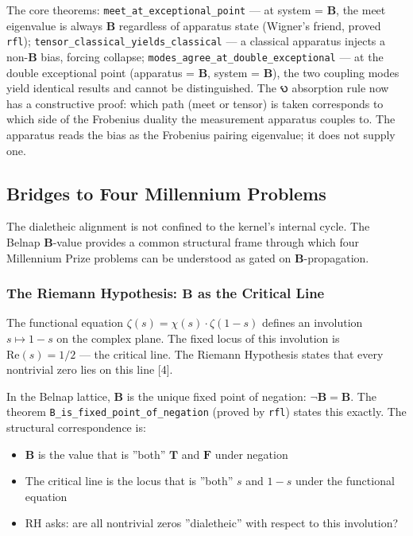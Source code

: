 \documentclass[10pt,a4paper]{article}
\begin{document}
The core theorems: \texttt{meet\_\allowbreak at\_\allowbreak exceptional\_\allowbreak point} --- at system = $\mathbf{B}$, the meet eigenvalue is always $\mathbf{B}$ regardless of apparatus state (Wigner's friend, proved \texttt{rfl}); \texttt{tensor\_\allowbreak classical\_\allowbreak yields\_\allowbreak classical} --- a classical apparatus injects a non-$\mathbf{B}$ bias, forcing collapse; \texttt{modes\_\allowbreak agree\_\allowbreak at\_\allowbreak double\_\allowbreak exceptional} --- at the double exceptional point (apparatus = $\mathbf{B}$, system = $\mathbf{B}$), the two coupling modes yield identical results and cannot be distinguished. The 𐑻 absorption rule now has a constructive proof: which path (meet or tensor) is taken corresponds to which side of the Frobenius duality the measurement apparatus couples to. The apparatus reads the bias as the Frobenius pairing eigenvalue; it does not supply one.

\subsection{Bridges to Four Millennium Problems}

The dialetheic alignment is not confined to the kernel's internal cycle. The Belnap $\mathbf{B}$-value provides a common structural frame through which four Millennium Prize problems can be understood as gated on $\mathbf{B}$-propagation.

\subsubsection{The Riemann Hypothesis: $\mathbf{B}$ as the Critical Line}

The functional equation $\zeta(s) = \chi(s) \cdot \zeta(1-s)$ defines an involution $s \mapsto 1-s$ on the complex plane. The fixed locus of this involution is $\text{Re}(s) = 1/2$ --- the critical line. The Riemann Hypothesis states that every nontrivial zero lies on this line {[}4{]}.

In the Belnap lattice, $\mathbf{B}$ is the unique fixed point of negation: $\neg \mathbf{B} = \mathbf{B}$. The theorem \texttt{B\_\allowbreak is\_\allowbreak fixed\_\allowbreak point\_\allowbreak of\_\allowbreak negation} (proved by \texttt{rfl}) states this exactly. The structural correspondence is:

\begin{itemize}
    \item $\mathbf{B}$ is the value that is ''both'' $\mathbf{T}$ and $\mathbf{F}$ under negation
    \item The critical line is the locus that is ''both'' $s$ and $1-s$ under the functional equation
    \item RH asks: are all nontrivial zeros ''dialetheic'' with respect to this involution?
\end{itemize}
\end{document}
